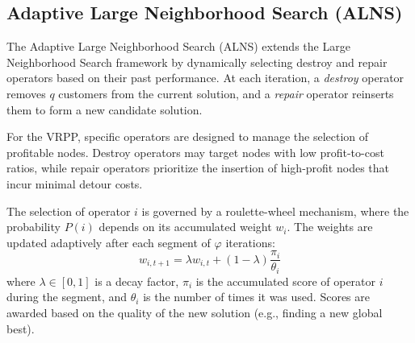 \documentclass[orivec,runningheads]{llncs}
\begin{document}
\begin{center}
\begin{longtable}
\subsection{Adaptive Large Neighborhood Search (ALNS)}
The Adaptive Large Neighborhood Search (ALNS) extends the Large Neighborhood Search framework by dynamically selecting destroy and repair operators based on their past performance. At each iteration, a \textit{destroy} operator removes $q$ customers from the current solution, and a \textit{repair} operator reinserts them to form a new candidate solution.

For the VRPP, specific operators are designed to manage the selection of profitable nodes. Destroy operators may target nodes with low profit-to-cost ratios, while repair operators prioritize the insertion of high-profit nodes that incur minimal detour costs.

The selection of operator $i$ is governed by a roulette-wheel mechanism, where the probability $P(i)$ depends on its accumulated weight $w_i$. The weights are updated adaptively after each segment of $\varphi$ iterations:
\begin{equation}
    w_{i,t+1} = \lambda w_{i,t} + (1-\lambda) \frac{\pi_i}{\theta_i}
\end{equation}
where $\lambda \in [0, 1]$ is a decay factor, $\pi_i$ is the accumulated score of operator $i$ during the segment, and $\theta_i$ is the number of times it was used. Scores are awarded based on the quality of the new solution (e.g., finding a new global best).


\end{longtable}
\end{center}
\end{document}
